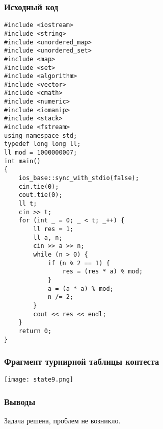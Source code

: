 \documentclass[12pt]{article}
\begin{document}
\subsubsection*{Исходный код}
\begin{lstlisting}
#include <iostream>
#include <string>
#include <unordered_map>
#include <unordered_set>
#include <map>
#include <set>
#include <algorithm>
#include <vector>
#include <cmath>
#include <numeric>
#include <iomanip>
#include <stack>
#include <fstream>
using namespace std;
typedef long long ll;
ll mod = 1000000007;
int main()
{
    ios_base::sync_with_stdio(false);
    cin.tie(0);
    cout.tie(0);
    ll t;
    cin >> t;
    for (int _ = 0; _ < t; _++) {
        ll res = 1;
        ll a, n;
        cin >> a >> n;
        while (n > 0) {
            if (n % 2 == 1) {
                res = (res * a) % mod;
            }
            a = (a * a) % mod;
            n /= 2;
        }
        cout << res << endl;
    }
    return 0;
}
\end{lstlisting}
\subsubsection*{Фрагмент турнирной таблицы контеста}
\begin{center}
\texttt{[image: state9.png]}\newline\noindent
\end{center}

\subsubsection*{Выводы}
Задача решена, проблем не возникло.
\end{document}

